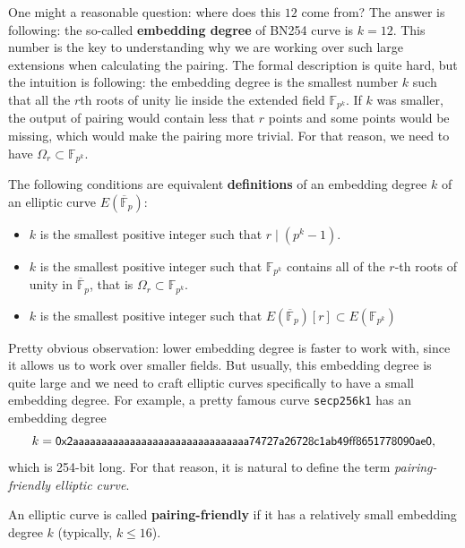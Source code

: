 \documentclass[../lecture-notes.tex]{subfiles}
\begin{document}
\begin{remark}
    One might a reasonable question: where does this $12$ come from? The answer is following: the so-called \textbf{embedding degree} of BN254 curve is $k=12$. This number is the key to understanding why we are working over such large extensions when calculating the pairing. The formal description is quite hard, but the intuition is following: the embedding degree is the smallest number $k$ such that all the $r$th roots of unity lie inside the extended field $\mathbb{F}_{p^k}$. If $k$ was smaller, the output of pairing would contain less that $r$ points and some points would be missing, which would make the pairing more trivial. For that reason, we need to have $\Omega_r \subset \mathbb{F}_{p^k}$.
\end{remark}

\begin{definition}
    The following conditions are equivalent \textbf{definitions} of an embedding degree $k$ of an elliptic curve $E(\overline{\mathbb{F}}_p)$:
    \begin{itemize}
        \item $k$ is the smallest positive integer such that $r \mid (p^k-1)$.
        \item $k$ is the smallest positive integer such that $\mathbb{F}_{p^k}$ contains all of the $r$-th roots of unity in $\overline{\mathbb{F}}_p$, that is $\Omega_r \subset \mathbb{F}_{p^k}$.
        \item $k$ is the smallest positive integer such that $E(\overline{\mathbb{F}}_p)[r] \subset E(\mathbb{F}_{p^k})$
    \end{itemize}
\end{definition}

Pretty obvious observation: lower embedding degree is faster to work with, since it allows us to work over smaller fields. But usually, this embedding degree is quite large and we need to craft elliptic curves specifically to have a small embedding degree. For example, a pretty famous curve \texttt{secp256k1} has an embedding degree
\begin{equation*}
    k = \scalebox{0.95}{$\mathsf{0x2aaaaaaaaaaaaaaaaaaaaaaaaaaaaaaa74727a26728c1ab49ff8651778090ae0}$},
\end{equation*}
which is 254-bit long. For that reason, it is natural to define the term \textit{pairing-friendly elliptic curve}.
\begin{definition}
    An elliptic curve is called \textbf{pairing-friendly} if it has a relatively small embedding degree $k$ (typically, $k \leq 16$).
\end{definition}
\end{document}
